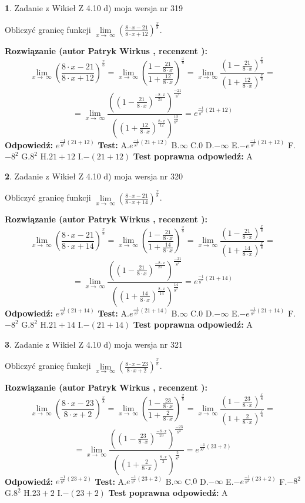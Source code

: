 \documentclass[12pt, a4paper]{article}
\theoremstyle{definition} %
\newtheorem{zad}{}
\newcommand{\zadStart}[1]{\begin{zad}#1\newline}
\newcommand{\zadStop}{\end{zad}}
\newcommand{\rozwStart}[2]{\noindent \textbf{Rozwiązanie (autor #1 , recenzent #2): }\newline}
\newcommand{\rozwStop}{\newline}
\newcommand{\odpStart}{\noindent \textbf{Odpowiedź:}\newline}
\newcommand{\odpStop}{\newline}
\newcommand{\testStart}{\noindent \textbf{Test:}\newline}
\newcommand{\testStop}{\newline}
\newcommand{\kluczStart}{\noindent \textbf{Test poprawna odpowiedź:}\newline}
\newcommand{\kluczStop}{\newline}
\begin{document}
\zadStart{Zadanie z Wikieł Z 4.10 d) moja wersja nr 319}


Obliczyć granicę funkcji  $\lim\limits_{x\to\ \infty}(\frac{8\cdot x-21}{8\cdot x+12})^{\frac{x}{8}}$.
\zadStop
\rozwStart{Patryk Wirkus}{}
$$\lim\limits_{x\to\ \infty}(\frac{8\cdot x-21}{8\cdot x+12})^{\frac{x}{8}} = \lim\limits_{x\to\ \infty}(\frac{1-\frac{21}{8\cdot x}}{1+\frac{12}{8\cdot x}})^{\frac{x}{8}}=\lim\limits_{x\to\ \infty}\frac{(1-\frac{21}{8\cdot x})^{\frac{x}{8}}}{(1+\frac{12}{8\cdot x})^{\frac{x}{8}}}=$$
$$=\lim\limits_{x\to\ \infty}\frac{((1-\frac{21}{8\cdot x})^{\frac{-8\cdot x}{21}})^{\frac{-21}{8^{2}}}}{((1+\frac{12}{8\cdot x})^{\frac{8\cdot x}{12}})^{\frac{12}{8^{2}}}}=e^{\frac{-1}{8^{2}}(21+12)}$$
\rozwStop
\odpStart
$e^{\frac{-1}{8^{2}}(21+12)}$
\odpStop
\testStart
A.$e^{\frac{-1}{8^{2}}(21+12)}$ B.$\infty$ C.$0$ D.$-\infty$ E.$-e^{\frac{-1}{8^{2}}(21+12)}$
F.$-8^{2}$ G.$8^{2}$
H.$21+12$
I.$-(21+12)$
\testStop
\kluczStart
A
\kluczStop



\zadStart{Zadanie z Wikieł Z 4.10 d) moja wersja nr 320}


Obliczyć granicę funkcji  $\lim\limits_{x\to\ \infty}(\frac{8\cdot x-21}{8\cdot x+14})^{\frac{x}{8}}$.
\zadStop
\rozwStart{Patryk Wirkus}{}
$$\lim\limits_{x\to\ \infty}(\frac{8\cdot x-21}{8\cdot x+14})^{\frac{x}{8}} = \lim\limits_{x\to\ \infty}(\frac{1-\frac{21}{8\cdot x}}{1+\frac{14}{8\cdot x}})^{\frac{x}{8}}=\lim\limits_{x\to\ \infty}\frac{(1-\frac{21}{8\cdot x})^{\frac{x}{8}}}{(1+\frac{14}{8\cdot x})^{\frac{x}{8}}}=$$
$$=\lim\limits_{x\to\ \infty}\frac{((1-\frac{21}{8\cdot x})^{\frac{-8\cdot x}{21}})^{\frac{-21}{8^{2}}}}{((1+\frac{14}{8\cdot x})^{\frac{8\cdot x}{14}})^{\frac{14}{8^{2}}}}=e^{\frac{-1}{8^{2}}(21+14)}$$
\rozwStop
\odpStart
$e^{\frac{-1}{8^{2}}(21+14)}$
\odpStop
\testStart
A.$e^{\frac{-1}{8^{2}}(21+14)}$ B.$\infty$ C.$0$ D.$-\infty$ E.$-e^{\frac{-1}{8^{2}}(21+14)}$
F.$-8^{2}$ G.$8^{2}$
H.$21+14$
I.$-(21+14)$
\testStop
\kluczStart
A
\kluczStop



\zadStart{Zadanie z Wikieł Z 4.10 d) moja wersja nr 321}


Obliczyć granicę funkcji  $\lim\limits_{x\to\ \infty}(\frac{8\cdot x-23}{8\cdot x+2})^{\frac{x}{8}}$.
\zadStop
\rozwStart{Patryk Wirkus}{}
$$\lim\limits_{x\to\ \infty}(\frac{8\cdot x-23}{8\cdot x+2})^{\frac{x}{8}} = \lim\limits_{x\to\ \infty}(\frac{1-\frac{23}{8\cdot x}}{1+\frac{2}{8\cdot x}})^{\frac{x}{8}}=\lim\limits_{x\to\ \infty}\frac{(1-\frac{23}{8\cdot x})^{\frac{x}{8}}}{(1+\frac{2}{8\cdot x})^{\frac{x}{8}}}=$$
$$=\lim\limits_{x\to\ \infty}\frac{((1-\frac{23}{8\cdot x})^{\frac{-8\cdot x}{23}})^{\frac{-23}{8^{2}}}}{((1+\frac{2}{8\cdot x})^{\frac{8\cdot x}{2}})^{\frac{2}{8^{2}}}}=e^{\frac{-1}{8^{2}}(23+2)}$$
\rozwStop
\odpStart
$e^{\frac{-1}{8^{2}}(23+2)}$
\odpStop
\testStart
A.$e^{\frac{-1}{8^{2}}(23+2)}$ B.$\infty$ C.$0$ D.$-\infty$ E.$-e^{\frac{-1}{8^{2}}(23+2)}$
F.$-8^{2}$ G.$8^{2}$
H.$23+2$
I.$-(23+2)$
\testStop
\kluczStart
A
\kluczStop
\end{document}
